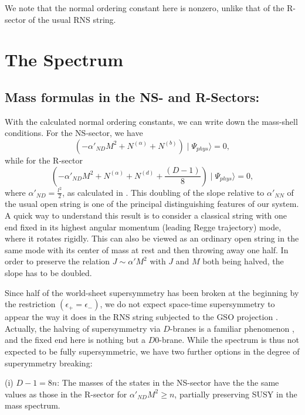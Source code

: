 \documentclass[a4paper,a4paper]{article}
\begin{document}
We note that the normal ordering constant here is nonzero, unlike
that of the R-sector of the usual RNS string.

\section{The Spectrum}
\subsection{Mass formulas in the NS- and R-Sectors:}

With the calculated normal ordering constants, we can write down
the mass-shell conditions.  For the NS-sector, we have
\begin{equation}
(-\alpha'_{ND}M^{2}+N^{(\alpha)}+N^{(b)})\mid\Psi_{phys}\rangle=0,
\end{equation}
while for the R-sector
\begin{equation}
(-\alpha'_{ND}M^{2}+N^{(\alpha)}+N^{(d)}+
\frac{(D-1)}{8})\mid\Psi_{phys}\rangle=0,
\end{equation}
where $\alpha'_{ND}=\frac{l^{2}}{2}$, as calculated in \cite{Gursoy}.
This doubling of the slope relative to $\alpha'_{NN}$ of the usual
open string is one of the principal distinguishing features of our
system. A quick way to understand this result is to consider a
classical string with one end fixed in its highest angular
momentum (leading Regge trajectory) mode, where it rotates
rigidly. This can also be viewed as an ordinary open string in the
same mode with its center of mass at rest and then throwing away
one half.  In order to preserve the  relation $J \sim \alpha' M^2$
with $J$ and $M$ both being halved, the slope has to be doubled.

Since half of the world-sheet supersymmetry has been broken at the
beginning by the restriction $(\epsilon_{+}=\epsilon_{-})$, we do
not expect  space-time supersymmetry to appear the way it does in
the RNS string subjected to the GSO projection \cite{GSO}. Actually, the
halving of supersymmetry via $D$-branes is a familiar
phenomenon \cite{Pol2}, and the fixed end here is nothing but a
$D0$-brane.  While the spectrum is thus not expected to be fully
supersymmetric, we have two further options in the degree of
superymmetry breaking:

(i) $D-1=8n$:   The masses of the states in the NS-sector have the
the same values as those in the R-sector for $\alpha'_{ND}M^{2}\geq
n$, partially preserving SUSY in the mass spectrum.
\end{document}
